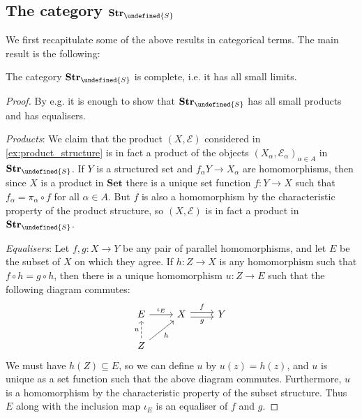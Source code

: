 \documentclass[article, a4paper, 11pt, oneside]{memoir}
\let\mathfrak\undefined
\numberwithin{equation}{chapter}
\newcommand{\calE}{\mathcal{E}}
\newcommand{\strucS}{\mathfrak{S}}
\newcommand{\ncat}[1]{\mathbf{#1}} %
\newcommand{\catSet}{\ncat{Set}} %
\newcommand{\catStruc}[1]{\ncat{Str}_{#1}} %
\newcommand{\catStrucS}{\catStruc{\strucS}} %
\begin{document}
\subsection{The category $\catStrucS$}

We first recapitulate some of the above results in categorical terms. The main result is the following:

\begin{theorem}[Completeness of $\catStrucS$]
    The category $\catStrucS$ is complete, i.e. it has all small limits.
\end{theorem}

\begin{proof}
    By e.g. \textcite[Theorem~60]{smithcategory} it is enough to show that $\catStrucS$ has all small products and has equalisers.

    \emph{Products}: We claim that the product $(X, \calE)$ considered in \cref{ex:product_structure} is in fact a product of the objects $(X_\alpha, \calE_\alpha)_{\alpha \in A}$ in $\catStrucS$. If $Y$ is a structured set and $f_\alpha Y \to X_\alpha$ are homomorphisms, then since $X$ is a product in $\catSet$ there is a unique set function $f \colon Y \to X$ such that $f_\alpha = \pi_\alpha \circ f$ for all $\alpha \in A$. But $f$ is also a homomorphism by the characteristic property of the product structure, so $(X, \calE)$ is in fact a product in $\catStrucS$.

    \emph{Equalisers}: Let $f,g \colon X \to Y$ be any pair of parallel homomorphisms, and let $E$ be the subset of $X$ on which they agree. If $h \colon Z \to X$ is any homomorphism such that $f \circ h = g \circ h$, then there is a unique homomorphism $u \colon Z \to E$ such that the following diagram commutes:
    \begin{equation*}
        \begin{tikzcd}
            E
                \ar[r, "\iota_E"]
            & X
                \ar[r, shift left, "f"]
                \ar[r, shift right, "g", swap]
            & Y \\
            Z
                \ar[u, dashed, "u"]
                \ar[ur, "h", swap]
        \end{tikzcd}
    \end{equation*}
    We must have $h(Z) \subseteq E$, so we can define $u$ by $u(z) = h(z)$, and $u$ is unique as a set function such that the above diagram commutes. Furthermore, $u$ is a homomorphism by the characteristic property of the subset structure. Thus $E$ along with the inclusion map $\iota_E$ is an equaliser of $f$ and $g$.
\end{proof}
\end{document}
